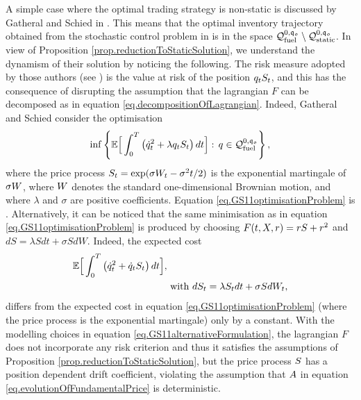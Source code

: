 \documentclass[10pt,a4paper]{article}
\begin{document}
	\begin{remark}\label{remark.GS11dynamicSolution}
		A simple case where the optimal trading strategy is non-static is discussed by Gatheral and Schied in \cite{GS11opt}. This means that the optimal inventory trajectory obtained from the stochastic control problem in \cite{GS11opt} is in the space $\spaceInventoryTrajectoriesFuel^{0,\initialInventory}\setminus \spaceInventoryTrajectoriesStatic^{0,\initialInventory}$.  In view of Proposition \ref{prop.reductionToStaticSolution}, we understand the dynamism of their solution by noticing the following. The risk measure adopted by those authors (see \cite[Section 2.1]{GS11opt}) is the value at risk of the position $\inventory_t \fundamentalPrice_t$, and this has the consequence of disrupting the assumption that the lagrangian $F$ can be decomposed as in equation \eqref{eq.decompositionOfLagrangian}. Indeed, Gatheral and Schied consider the optimisation 
		\begin{equation}\label{eq.GS11optimisationProblem}
		\inf\left\lbrace
		\Expectation \Big[
		\int_{0}^{\timeHorizon} \left(\inventoryRate_t\squared + \lambda \inventory_t\fundamentalPrice_t\right) dt
		\Big]
		 : \, \inventory \in \spaceInventoryTrajectoriesFuel^{0,\initialInventory}
		\right\rbrace,
		\end{equation}
		where the price process  $\fundamentalPrice_t = \exp(\sigma\brownianMotion_t -\sigma\squared t /2)$ is the exponential martingale of $\sigma\brownianMotion$, where $\brownianMotion$ denotes  the standard one-dimensional Brownian motion, and where $\lambda$ and $\sigma$ are positive coefficients. Equation \eqref{eq.GS11optimisationProblem} is  \cite[Equation (2.7)]{GS11opt}.
		Alternatively, it can be noticed that the same minimisation as in equation \eqref{eq.GS11optimisationProblem} is produced by choosing $F(t,X,r)=rS +  r\squared$ and $dS=\lambda Sdt +\sigma SdW$. Indeed, the expected cost 
		\begin{equation}\label{eq.GS11alternativeFormulation}
		\begin{split}
		\Expectation \Big[
		\int_{0}^{\timeHorizon} \left(\inventoryRate_t\squared +   \inventoryRate_t\fundamentalPrice_t\right) dt
		\Big],& \\
		& \text{ with } 
		d\fundamentalPrice_t = \lambda \fundamentalPrice_t dt + \sigma \fundamentalPrice d\brownianMotion_t,
		\end{split}
		\end{equation}
		differs from the expected cost in equation  \eqref{eq.GS11optimisationProblem} (where the price process is the exponential martingale) only by a constant. With the modelling choices in equation \eqref{eq.GS11alternativeFormulation}, the lagrangian $F$ does not incorporate any risk criterion and thus it satisfies the assumptions of Proposition \ref{prop.reductionToStaticSolution}, but the price process $\fundamentalPrice$ has a position dependent drift coefficient, violating  the assumption that $\boundedVariationPart$ in equation \eqref{eq.evolutionOfFundamentalPrice} is deterministic.
	\end{remark}
\end{document}

